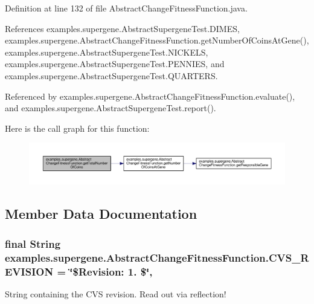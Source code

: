 Definition at line 132 of file Abstract\-Change\-Fitness\-Function.\-java.



References examples.\-supergene.\-Abstract\-Supergene\-Test.\-D\-I\-M\-E\-S, examples.\-supergene.\-Abstract\-Change\-Fitness\-Function.\-get\-Number\-Of\-Coins\-At\-Gene(), examples.\-supergene.\-Abstract\-Supergene\-Test.\-N\-I\-C\-K\-E\-L\-S, examples.\-supergene.\-Abstract\-Supergene\-Test.\-P\-E\-N\-N\-I\-E\-S, and examples.\-supergene.\-Abstract\-Supergene\-Test.\-Q\-U\-A\-R\-T\-E\-R\-S.



Referenced by examples.\-supergene.\-Abstract\-Change\-Fitness\-Function.\-evaluate(), and examples.\-supergene.\-Abstract\-Supergene\-Test.\-report().



Here is the call graph for this function\-:
\nopagebreak
\begin{figure}[H]
\begin{center}
\leavevmode
\includegraphics[width=350pt]{classexamples_1_1supergene_1_1_abstract_change_fitness_function_aacde9b3f541743a1840cc4d8539e97f7_cgraph}
\end{center}
\end{figure}




\subsection{Member Data Documentation}
\hypertarget{classexamples_1_1supergene_1_1_abstract_change_fitness_function_a17bdff475188176a202a6a884ba82853}{
\subsubsection[{C\-V\-S\-\_\-\-R\-E\-V\-I\-S\-I\-O\-N}]{\setlength{\rightskip}{0pt plus 5cm}final String examples.\-supergene.\-Abstract\-Change\-Fitness\-Function.\-C\-V\-S\-\_\-\-R\-E\-V\-I\-S\-I\-O\-N = \char`\"{}\$Revision\-: 1. \$\char`\"{}\hspace{0.3cm}{\ttfamily [static]}, {\ttfamily [private]}}}\label{classexamples_1_1supergene_1_1_abstract_change_fitness_function_a17bdff475188176a202a6a884ba82853}
String containing the C\-V\-S revision. Read out via reflection! 

